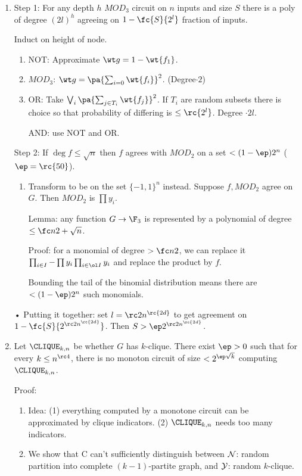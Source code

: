\begin{enumerate}
\begin{proof}
\begin{enumerate}
\end{enumerate}•
\end{proof}
\item 
Step 1: For any depth $h$ $MOD_3$ circuit on $n$ inputs and size $S$ there is a poly of degree $(2l)^h$ agreeing on $1-\fc{S}{2^l}$ fraction of inputs.

Induct on height of node. 
\begin{enumerate}
\item
NOT: Approximate $\wt g=1-\wt{f_1}$.
\item
$MOD_3$: $\wt g=\pa{\sum_{i=0} \wt{f_i}}^2$. (Degree$\cdot 2$)
\item
OR: Take $\bigvee_i \pa{\sum_{j\in T_i}\wt{f_j}}^2$. If $T_i$ are random subsets there is choice so that probability of differing is $\le \rc{2^l}$. Degree $\cdot 2l$.

AND: use NOT and OR.
\end{enumerate}

Step 2: If $\deg f\le \sqrt n$ then $f$ agrees with $MOD_2$ on a set $<(1-\ep)2^n$ ($\ep=\rc{50}$). 
\begin{enumerate}
\item
Transform to be on the set $\{-1,1\}^n$ instead. Suppose $f,MOD_2$ agree on $G$. Then $MOD_2$ is $\prod y_i$. 

Lemma: any function $G\to \F_3$ is represented by a polynomial of degree $\le \fc n2+\sqrt n$.

Proof: for a monomial of degree $>\fc n2$, we can replace it $\prod_{i\in I}-\prod y_i\prod_{i\in \ol I}y_i$ and replace the product by $f$.

Bounding the tail of the binomial distribution means there are $<(1-\ep)2^n$ such monomials.
\end{enumerate}•
Putting it together: set $l=\rc2 n^{\rc{2d}}$ to get agreement on $1-\fc{S}{2^{\rc2n^{\rc{2d}}}}$. Then $S>\ep 2^{\rc2n^{\rc{2d}}}$.
\item
Let $\CLIQUE_{k,n}$ be whether $G$ has $k$-clique. There exist $\ep>0$ such that for every $k\le n^{\rc 4}$, there is no monoton circuit of size $<2^{\ep \sqrt k}$ computing $\CLIQUE_{k,n}$.

Proof: 
\begin{enumerate}
\item Idea: (1) everything computed by a monotone circuit can be approximated by clique indicators. (2) $\CLIQUE_{k,n}$ needs too many indicators.
\item We show that C can't sufficiently distinguish between $\cal N$: random partition into complete $(k-1)$-partite graph, and $\cal Y$: random $k$-clique.


\end{enumerate}
\end{enumerate}
